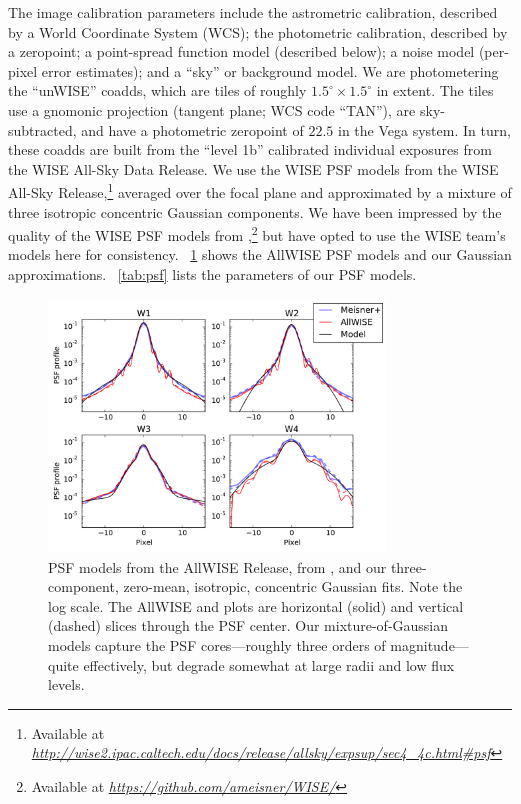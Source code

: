 \documentclass[12pt,preprint]{aastex}
\newcommand{\niceurl}[1]{\href{#1}{\textsl{#1}}}
\newcommand{\figref}[1]{\figurename~\ref{#1}}
\newcommand{\Figref}[1]{\figref{#1}}
\newcommand{\tabref}[1]{\tablename~\ref{#1}}
\newcommand{\Tableref}[1]{\tabref{#1}}
\begin{document}
The image calibration parameters include the astrometric calibration,
described by a World Coordinate System (WCS); the photometric
calibration, described by a zeropoint; a point-spread function model (described below);
a noise model (per-pixel error estimates); and a ``sky'' or background
model.  We are photometering the ``unWISE'' coadds, which are tiles of
roughly $1.5^\circ \times 1.5^\circ$ in extent.  The tiles use a
gnomonic projection (tangent plane; WCS code ``TAN''), are
sky-subtracted, and have a photometric zeropoint of $22.5$ in the Vega
system.  In turn, these coadds are built from the ``level 1b'' calibrated
individual exposures from the WISE All-Sky Data Release.  
%
We use the WISE PSF models from the WISE All-Sky
Release,\footnote{Available at
  \niceurl{http://wise2.ipac.caltech.edu/docs/release/allsky/expsup/sec4\_4c.html\#psf}}
averaged over the focal plane and approximated by a mixture of three
isotropic concentric Gaussian components.
%
We have been impressed by the quality of the WISE PSF models from
\citet{meisner},\footnote{Available at
  \niceurl{https://github.com/ameisner/WISE/}} but have opted to use
the WISE team's models here for consistency.
%
\Figref{fig:psf} shows the AllWISE PSF models and our Gaussian
approximations.  \Tableref{tab:psf} lists the parameters of our PSF
models.


\begin{figure}
  \begin{center}
    \includegraphics[width=0.8\textwidth]{psf-00}
  \end{center}
  \caption{%
    PSF models from the AllWISE Release, from \citealt{meisner}, and
    our three-component, zero-mean, isotropic, concentric Gaussian
    fits.  Note the log scale.  The AllWISE and \citealt{meisner}
    plots are horizontal (solid) and vertical (dashed) slices through
    the PSF center.  Our mixture-of-Gaussian models capture the PSF
    cores---roughly three orders of magnitude---quite effectively, but
    degrade somewhat at large radii and low flux levels.
    \label{fig:psf}}
\end{figure}
\end{document}
